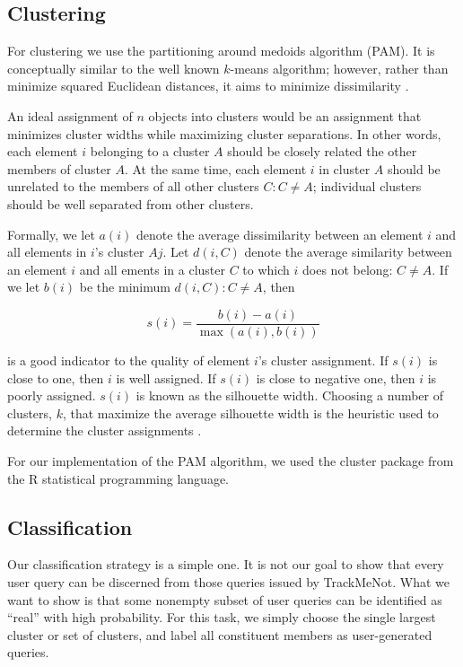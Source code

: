 \documentclass[11pt]{article}
\begin{document}
\begin{multicols}{2}
\subsection{Clustering}
\label{sec:clustering}
For clustering we use the partitioning around medoids algorithm
(PAM). It is conceptually similar to the well known $k$-means
algorithm; however, rather than minimize squared Euclidean distances,
it aims to minimize dissimilarity \cite{Kaufmann1990}. 

An ideal assignment of $n$ objects into clusters would be an assignment that minimizes cluster widths while maximizing cluster separations. In other words, each element $i$ belonging to a cluster $A$ should be closely related the other members of cluster $A$. At the same time, each element $i$ in cluster $A$ should be unrelated to the members of all other clusters $C : C \neq A$; individual clusters should be well separated from other clusters.

Formally, we let $a(i)$ denote the average dissimilarity between an element $i$ and all elements in $i$'s cluster $Aj$. Let $d(i,C)$ denote the average similarity between an element $i$ and all ements in a cluster $C$ to which $i$ does not belong: $C \neq A$. If we let $b(i)$ be the minimum $d(i,C) : C \neq A$, then

\[ s(i) = \frac{b(i)-a(i)}{\max{(a(i),b(i))}} \]

is a good indicator to the quality of element $i$'s cluster assignment. If $s(i)$ is close to one, then $i$ is well assigned. If $s(i)$ is close to negative one, then $i$ is poorly assigned. $s(i)$ is known as the silhouette width. Choosing a number of clusters, $k$, that maximize the average silhouette width is the heuristic used to determine the cluster assignments \cite{Kaufmann1990}.

For our implementation of the PAM algorithm, we used the cluster
package from the R statistical programming language\cite{Rcluster}.

\subsection{Classification}
\label{sec:classification}
Our classification strategy is a simple one. It is not our goal to show that every user query can be discerned from those queries issued by TrackMeNot. What we want to show is that some nonempty subset of user queries can be identified as ``real'' with high probability. For this task, we simply choose the single largest cluster or set of clusters, and label all constituent members as user-generated queries.


\end{multicols}
\end{document}
